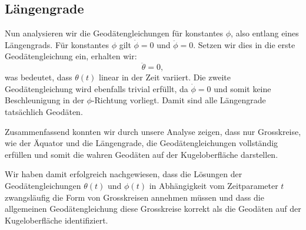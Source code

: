 \subsection{Längengrade}
Nun analysieren wir die Geodätengleichungen für konstantes $\phi$, also entlang eines Längengrads.
Für konstantes $\phi$ gilt $\dot{\phi} = 0$ und $\ddot{\phi} = 0$.
Setzen wir dies in die erste Geodätengleichung ein, erhalten wir:
\begin{equation}
	\ddot{\theta} = 0,
\end{equation}
was bedeutet, dass $\theta(t)$ linear in der Zeit variiert.
Die zweite Geodätengleichung wird ebenfalls trivial erfüllt, da $\dot{\phi} = 0$ und somit keine Beschleunigung in der $\phi$-Richtung vorliegt.
Damit sind alle Längengrade tatsächlich Geodäten.

Zusammenfassend konnten wir durch unsere Analyse zeigen, dass nur Grosskreise, wie der Äquator und die Längengrade, die Geodätengleichungen vollständig erfüllen und somit die wahren Geodäten auf der Kugeloberfläche darstellen.

Wir haben damit erfolgreich nachgewiesen, dass die Lösungen der Geodätengleichungen $\theta(t)$ und $\phi(t)$ in Abhängigkeit vom Zeitparameter $t$ zwangsläufig die Form von Grosskreisen annehmen müssen und dass die allgemeinen Geodätengleichung diese Grosskreise korrekt als die Geodäten auf der Kugeloberfläche identifiziert.


